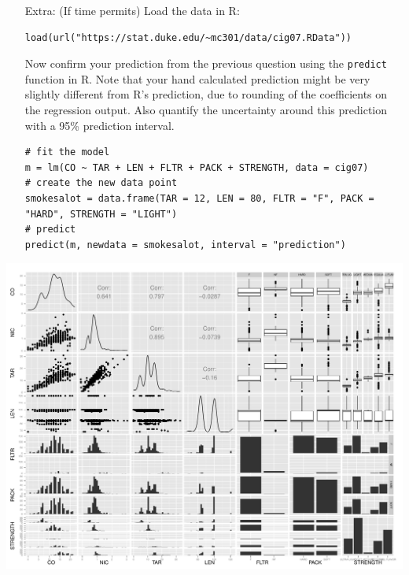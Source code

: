 \documentclass[11pt]{article}
\begin{document}
\begin{enumerate}[resume]
\item[Extra:] (If time permits) Load the data in R:

{\small
\begin{Verbatim}[frame=single, formatcom=\color{blue}]
load(url("https://stat.duke.edu/~mc301/data/cig07.RData"))
\end{Verbatim}
}

Now confirm your prediction from the previous question using the \texttt{predict} function in R. Note that your hand 
calculated prediction might be very slightly different from R's prediction, due to rounding of the coefficients on the regression output.
Also quantify the uncertainty around this prediction with a 95\% prediction interval.

{\small
\begin{Verbatim}[frame=single, formatcom=\color{blue}]
# fit the model
m = lm(CO ~ TAR + LEN + FLTR + PACK + STRENGTH, data = cig07)
# create the new data point
smokesalot = data.frame(TAR = 12, LEN = 80, FLTR = "F", PACK = "HARD", STRENGTH = "LIGHT")
# predict
predict(m, newdata = smokesalot, interval = "prediction")
\end{Verbatim}
}

\end{enumerate}


\pagebreak

\begin{landscape}

\begin{center}
\includegraphics[width=1.2\textwidth]{pairs.pdf}
\end{center}

\end{landscape}

%
\end{document}
